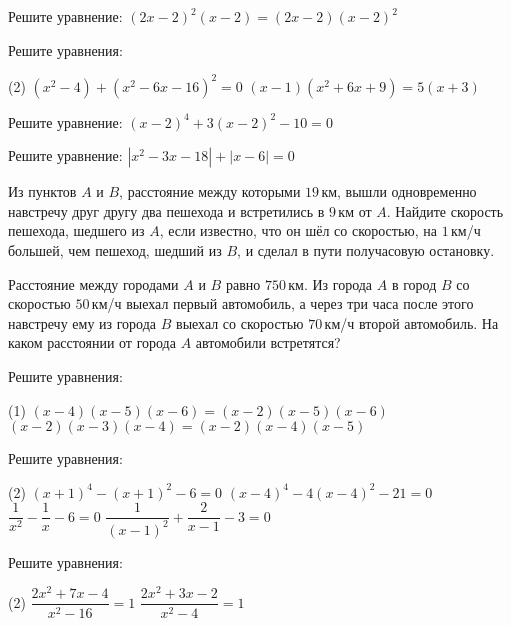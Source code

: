 \begin{class}[number=3]
	\begin{listofex}
		\item Решите уравнение:
		\((2x-2)^2(x-2)=(2x-2)(x-2)^2\)
		\item Решите уравнения: 
		\begin{tasks}(2)
			\task \((x^2-4)+(x^2-6x-16)^2=0\)
			\task \( (x-1)(x^2+6x+9)=5(x+3) \)
		\end{tasks}
		\item Решите уравнение: \quad \( (x-2)^4+3(x-2)^2-10=0 \)
		\item Решите уравнение: \quad \( |x^2-3x-18|+|x-6|=0 \)
		\item Из пунктов \( A \) и \( B \), расстояние между которыми \( 19 \) км, вышли одновременно навстречу друг другу два пешехода и встретились в \( 9 \) км от \( A \). Найдите скорость пешехода, шедшего из \( A \), если известно, что он шёл со скоростью, на \( 1 \) км/ч большей, чем пешеход, шедший из \( B \), и сделал в пути получасовую остановку.
		\item Расстояние между городами \( A \) и \( B \) равно \( 750 \) км. Из города \( A \) в город \( B \) со скоростью \( 50 \) км/ч выехал первый автомобиль, а через три часа после этого навстречу ему из города \( B \) выехал со скоростью \( 70 \) км/ч второй автомобиль. На каком расстоянии от города \( A \) автомобили встретятся?
	\end{listofex}
\end{class}

\begin{class}[number=4]
	\begin{listofex}
		\item Решите уравнения:
		\begin{tasks}(1)
			\task \( (x-4)(x-5)(x-6)=(x-2)(x-5)(x-6) \)
			\task \( (x-2)(x-3)(x-4)=(x-2)(x-4)(x-5) \)
		\end{tasks}
		\item Решите уравнения:
		\begin{tasks}(2)
			\task \( (x+1)^4-(x+1)^2-6=0 \)
			\task \( (x-4)^4-4(x-4)^2-21=0 \)
			\task \( \dfrac{1}{x^2}-\dfrac{1}{x}-6=0 \)
			\task \( \dfrac{1}{(x-1)^2}+\dfrac{2}{x-1}-3=0 \)
		\end{tasks}
		\item Решите уравнения:
		\begin{tasks}(2)
			\task \( \dfrac{2x^2+7x-4}{x^2-16}=1 \)
			\task \( \dfrac{2x^2+3x-2}{x^2-4}=1 \)
		\end{tasks}
	\end{listofex}
\end{class}

